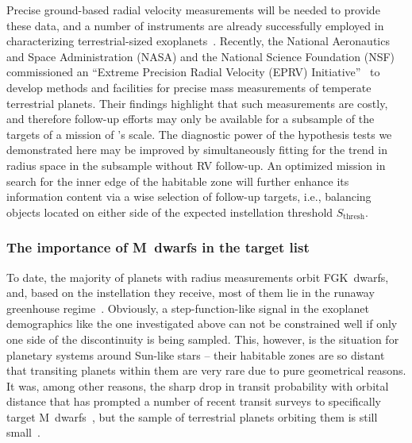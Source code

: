 \documentclass[twocolumn]{aastex631}
\begin{document}
Precise ground-based radial velocity measurements will be needed to provide these data, and a number of instruments are already successfully employed in characterizing terrestrial-sized exoplanets~\citep[e.g.,][]{Queloz2001a,Pepe2010,Johnson2010b,Ribas2023}.
Recently, the National Aeronautics and Space Administration (NASA) and the National Science Foundation (NSF) commissioned an ``Extreme Precision Radial Velocity (EPRV) Initiative''~\citep{Crass2021} to develop methods and facilities for precise mass measurements of temperate terrestrial planets.
Their findings highlight that such measurements are costly, and therefore follow-up efforts may only be available for a subsample of the targets of a mission of \plato's scale.
The diagnostic power of the hypothesis tests we demonstrated here may be improved by simultaneously fitting for the trend in radius space in the subsample without RV follow-up.
An optimized mission in search for the inner edge of the habitable zone will further enhance its information content via a wise selection of follow-up targets, i.e., balancing objects located on either side of the expected instellation threshold $S_\mathrm{thresh}$.

\subsubsection{The importance of M~dwarfs in the target list}
To date, the majority of planets with radius measurements orbit FGK~dwarfs, and, based on the instellation they receive, most of them lie in the runaway greenhouse regime~\citep{Thompson2018}.
Obviously, a step-function-like signal in the exoplanet demographics like the one investigated above can not be constrained well if only one side of the discontinuity is being sampled.
This, however, is the situation for planetary systems around Sun-like stars -- their habitable zones are so distant that transiting planets within them are very rare due to pure geometrical reasons.
It was, among other reasons, the sharp drop in transit probability with orbital distance that has prompted a number of recent transit surveys to specifically target M~dwarfs~\citep[e.g.,][]{Irwin2009,Obermeier2016,Delrez2018,Sebastian2021,Dietrich2023}, but the sample of terrestrial planets orbiting them is still small~\citep[e.g.,][]{Berger2020,Hardegree-Ullman2020a}.
\end{document}
